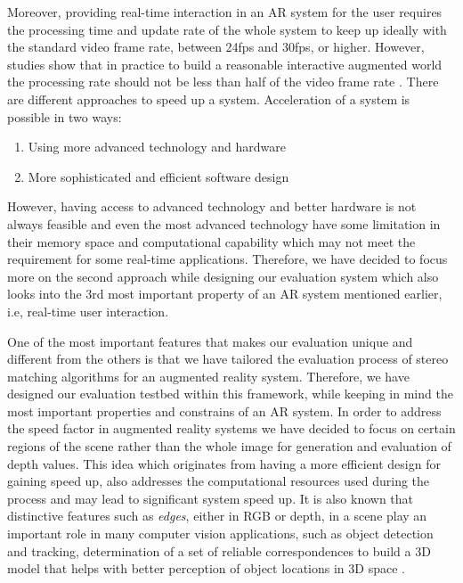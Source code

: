 \documentclass[dvips,letterpaper,12pt]{report}
\begin{document}
Moreover, providing real-time interaction in an AR system for the user requires the processing time and update rate of the whole system to keep up ideally with the standard video frame rate, 
between 24fps and 
30fps, or higher. 
However, studies show that in practice to build a reasonable interactive augmented world the processing rate should not be less than half of the video frame rate \cite{hertz00}. 
There are different approaches to speed up a system. Acceleration of a system is possible in two ways:
\begin{enumerate}
\item Using more advanced technology and hardware
\item More sophisticated and efficient software design
\end{enumerate}
However, having access to advanced technology and better hardware is not always feasible and even the most advanced technology have some limitation in their memory space and computational capability
which may not meet the requirement for some real-time applications. 
Therefore, we have decided to focus more on the second approach while designing our evaluation system which also looks into the 3rd most important property of
an AR system mentioned earlier, i.e, real-time user interaction. \newline 

One of the most important features that makes our evaluation unique and different from the others is that we have tailored the evaluation process of stereo matching algorithms for an augmented 
reality system. Therefore, we have designed our evaluation testbed within this framework, while keeping in mind the most important properties and constrains of an AR system.
In order to address the speed factor in augmented reality systems we have decided to focus on certain regions of the scene rather than the whole image for generation and evaluation of 
depth values.  
This idea which originates from having a more efficient design for gaining speed up, 
also addresses the computational resources used during the process and may lead to significant system speed up.
It is also known that distinctive features such as {\it edges}, either in RGB or depth, in a scene play an important role in many computer vision applications, such as object detection and 
tracking, determination of a set of reliable correspondences to build a 3D model that helps with better perception of object locations in 3D space \cite{mart01,sze11}.
\end{document}
